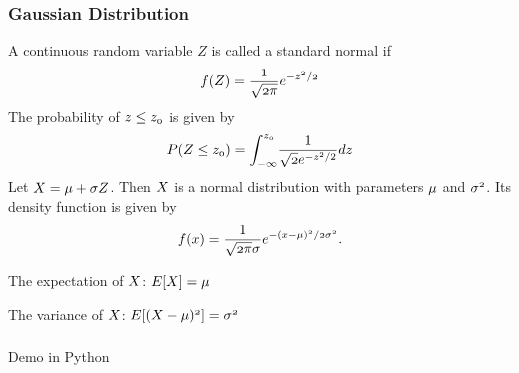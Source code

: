 \documentclass[notheorems, aspectratio=54]{beamer}
\begin{document}
\begin{frame}
\frametitle{Gaussian Distribution}
A continuous random variable $Z$ is called a standard normal if
$$\mathnormal{f(Z) = \frac{1}{\sqrt{2\pi}}e^{-z^2/2}}$$
The probability of $\mathnormal{z\leq z_0}$ is given by
$$\mathnormal{P(Z\leq z_0)} = \mathnormal{\int_{-\infty}^{z_{0}}}
\frac{1}{\mathnormal{\sqrt{2}}e^{-\mathnormal{z}^2/2}}\mathnormal{dz}$$ Let $\mathnormal{X=\mu+\sigma Z}$. Then $\mathnormal{X}$
is a normal distribution with parameters $\mathnormal{\mu}$ and $\mathnormal{\sigma^2}$. Its
density function is given by
$$\mathnormal{f(x)} = \frac{1}{\mathnormal{\sqrt{2\pi}\sigma}}\mathnormal{e^{-(x-\mu)^2/2\sigma^2}}.$$ 

The expectation of $\mathnormal{X}$: $\mathnormal{E[X]=\mu}$

The variance of $\mathnormal{X}$: $\mathnormal{E[(X-\mu)^2]=\sigma^2}$
\end{frame}

\begin{frame}
\frametitle{}
\begin{center}
 Demo in Python
\end{center}
\end{frame}
\end{document}
